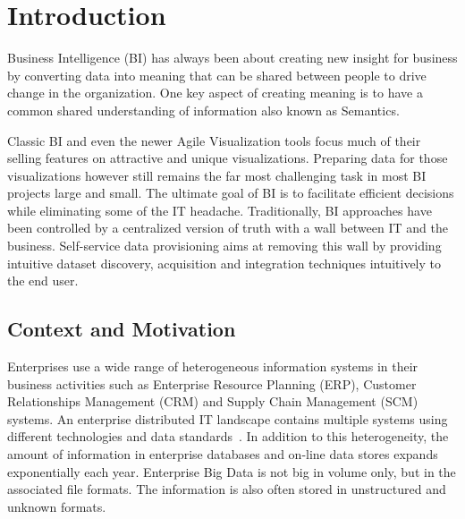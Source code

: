\documentclass[a4paper,11pt,twoside]{ThesisStyle}
\begin{document}

\vspace{3cm}

\tableofcontents

\let\cleardoublepage\clearpage
\chapter{Introduction}

Business Intelligence (BI) has always been about creating new insight for business by converting data into meaning that can be shared between people to drive change in the organization. One key aspect of creating meaning is to have a common shared understanding of information also known as Semantics.

Classic BI and even the newer Agile Visualization tools focus much of their selling features on attractive and unique visualizations. Preparing data for those visualizations however still remains the far most challenging task in most BI projects large and small. The ultimate goal of BI is to facilitate efficient decisions while eliminating some of the IT headache. Traditionally, BI approaches have been controlled by a centralized version of truth with a wall between IT and the business. Self-service data provisioning aims at removing this wall by providing intuitive dataset discovery, acquisition and integration techniques intuitively to the end user.

\section{Context and Motivation} \label{section:motivation}

Enterprises use a wide range of heterogeneous information systems in their business activities such as Enterprise Resource Planning (ERP), Customer Relationships Management (CRM) and Supply Chain Management (SCM) systems. An enterprise distributed IT landscape contains multiple systems using different technologies and data standards~\cite{Mihindukulasooriya:COLD:13}. In addition to this heterogeneity, the amount of information in enterprise databases and on-line data stores expands exponentially each year. Enterprise Big Data is not big in volume only, but in the associated file formats. The information is also often stored in unstructured and unknown formats.
\end{document}
